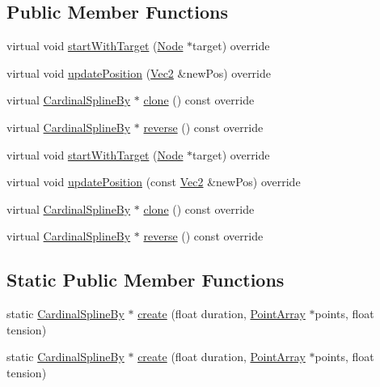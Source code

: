 \subsection*{Public Member Functions}
\begin{DoxyCompactItemize}
\item 
virtual void \hyperlink{classCardinalSplineBy_aaf4bff6ebce3d2ccf6dfaa71678d4462}{start\+With\+Target} (\hyperlink{classNode}{Node} $\ast$target) override
\item 
virtual void \hyperlink{classCardinalSplineBy_af49fedd4b7c5ef7c1a8cd58773c5644e}{update\+Position} (\hyperlink{classVec2}{Vec2} \&new\+Pos) override
\item 
virtual \hyperlink{classCardinalSplineBy}{Cardinal\+Spline\+By} $\ast$ \hyperlink{classCardinalSplineBy_a35b00381b2823644533fd485817b147e}{clone} () const override
\item 
virtual \hyperlink{classCardinalSplineBy}{Cardinal\+Spline\+By} $\ast$ \hyperlink{classCardinalSplineBy_ac5084ddc681589404f2a26d52815344b}{reverse} () const override
\item 
virtual void \hyperlink{classCardinalSplineBy_a913fc62fee3b78dcdeb76b9bf8d05b35}{start\+With\+Target} (\hyperlink{classNode}{Node} $\ast$target) override
\item 
virtual void \hyperlink{classCardinalSplineBy_ac28d6a528e8d265913b07d74a700cca9}{update\+Position} (const \hyperlink{classVec2}{Vec2} \&new\+Pos) override
\item 
virtual \hyperlink{classCardinalSplineBy}{Cardinal\+Spline\+By} $\ast$ \hyperlink{classCardinalSplineBy_abe6e897500669708f01d42fd97226a02}{clone} () const override
\item 
virtual \hyperlink{classCardinalSplineBy}{Cardinal\+Spline\+By} $\ast$ \hyperlink{classCardinalSplineBy_a565e7afdb1544698e29dda40a201ccae}{reverse} () const override
\end{DoxyCompactItemize}
\subsection*{Static Public Member Functions}
\begin{DoxyCompactItemize}
\item 
static \hyperlink{classCardinalSplineBy}{Cardinal\+Spline\+By} $\ast$ \hyperlink{classCardinalSplineBy_ac91380c9ea7b3209fe20d13995515bd2}{create} (float duration, \hyperlink{classPointArray}{Point\+Array} $\ast$points, float tension)
\item 
static \hyperlink{classCardinalSplineBy}{Cardinal\+Spline\+By} $\ast$ \hyperlink{classCardinalSplineBy_ad78125bb039894374af64265a85f6294}{create} (float duration, \hyperlink{classPointArray}{Point\+Array} $\ast$points, float tension)
\end{DoxyCompactItemize}
